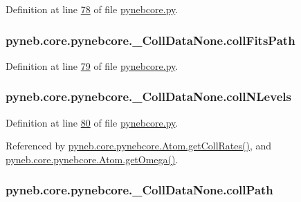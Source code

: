 Definition at line \hyperlink{pynebcore_8py_source_l00078}{78} of file \hyperlink{pynebcore_8py_source}{pynebcore.\-py}.

\hypertarget{classpyneb_1_1core_1_1pynebcore_1_1___coll_data_none_ad3bac87fe373ebf85361cc6c86b25c97}{
\subsubsection[{coll\-Fits\-Path}]{\setlength{\rightskip}{0pt plus 5cm}pyneb.\-core.\-pynebcore.\-\_\-\-Coll\-Data\-None.\-coll\-Fits\-Path}}\label{classpyneb_1_1core_1_1pynebcore_1_1___coll_data_none_ad3bac87fe373ebf85361cc6c86b25c97}


Definition at line \hyperlink{pynebcore_8py_source_l00079}{79} of file \hyperlink{pynebcore_8py_source}{pynebcore.\-py}.

\hypertarget{classpyneb_1_1core_1_1pynebcore_1_1___coll_data_none_aa6cfd6d6afa856ba4c102acc9180df42}{
\subsubsection[{coll\-N\-Levels}]{\setlength{\rightskip}{0pt plus 5cm}pyneb.\-core.\-pynebcore.\-\_\-\-Coll\-Data\-None.\-coll\-N\-Levels}}\label{classpyneb_1_1core_1_1pynebcore_1_1___coll_data_none_aa6cfd6d6afa856ba4c102acc9180df42}


Definition at line \hyperlink{pynebcore_8py_source_l00080}{80} of file \hyperlink{pynebcore_8py_source}{pynebcore.\-py}.



Referenced by \hyperlink{pynebcore_8py_source_l01394}{pyneb.\-core.\-pynebcore.\-Atom.\-get\-Coll\-Rates()}, and \hyperlink{pynebcore_8py_source_l01324}{pyneb.\-core.\-pynebcore.\-Atom.\-get\-Omega()}.

\hypertarget{classpyneb_1_1core_1_1pynebcore_1_1___coll_data_none_a3e39b0e757b0987e39ad0257a981ff13}{
\subsubsection[{coll\-Path}]{\setlength{\rightskip}{0pt plus 5cm}pyneb.\-core.\-pynebcore.\-\_\-\-Coll\-Data\-None.\-coll\-Path}}\label{classpyneb_1_1core_1_1pynebcore_1_1___coll_data_none_a3e39b0e757b0987e39ad0257a981ff13}


